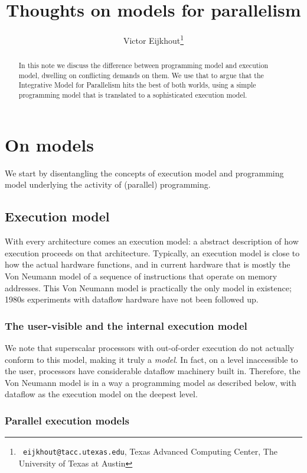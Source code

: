 \documentclass[11pt,fleqn,preprint]{impreport}
\title[Parallelism models]{Thoughts on models for parallelism}
\author[Eijkhout]{Victor Eijkhout\thanks{{\tt
      eijkhout@tacc.utexas.edu}, Texas Advanced Computing Center, The
    University of Texas at Austin}}
\begin{document}
\maketitle

\begin{abstract}
In this note we discuss the difference between programming model
and execution model, dwelling on conflicting demands on them.
We use that to argue that the Integrative Model for Parallelism
hits the best of both worlds, using a simple programming model
that is translated to a sophisticated execution model.
\end{abstract}

\section{On models}

We start by disentangling the concepts of execution model and
programming model underlying the activity of (parallel) programming.

\subsection{Execution model}

With every architecture comes an execution model: a abstract description
of how execution proceeds on that architecture. Typically,
an execution model is close to how the actual hardware functions,
and in current hardware that is mostly the Von Neumann model
of a sequence of instructions that operate on memory addresses. 
This Von Neumann model is practically the only model in existence;
1980s experiments with dataflow hardware have not been followed up.

\subsubsection{The user-visible and the internal execution model}

We note that superscalar processors with out-of-order execution
do not actually conform to this model, making it truly a \emph{model}.
In fact, on a level inaccessible to the user, processors have considerable dataflow
machinery built in. Therefore, the Von Neumann model is in a way a programming model
as described below, with dataflow as the execution model on the deepest level.

\subsubsection{Parallel execution models}
\end{document}

